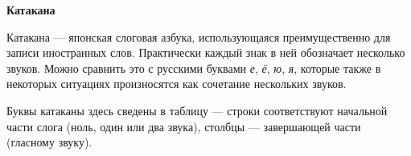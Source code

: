 \documentclass[10pt]{scrartcl}
\begin{document}
\begin{CJK}{UTF8}{min}
\vspace{3mm}

\begin{center}{\bfseries Катакана}\end{center}
\vspace{-2mm}

Катакана --- японская слоговая азбука, использующаяся преимущественно для записи иностранных слов.
Практически каждый знак в ней обозначает несколько звуков. Можно сравнить это с русскими
буквами \emph{е}, \emph{ё}, \emph{ю}, \emph{я}, которые также в некоторых ситуациях произносятся как сочетание нескольких звуков.

Буквы катаканы здесь сведены в таблицу --- строки соответствуют начальной части слога 
(ноль, один или два звука), столбцы --- завершающей части (гласному звуку).



\end{CJK}
\end{document}
